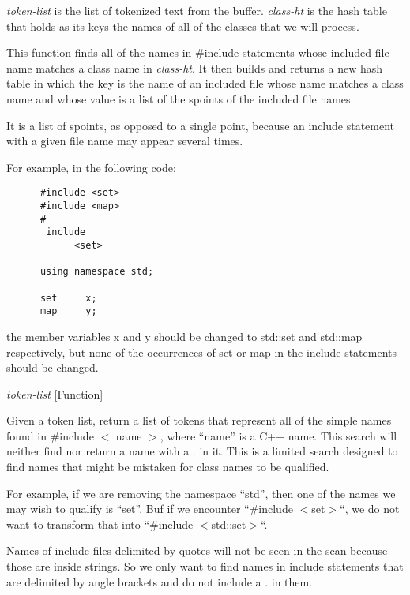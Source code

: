 \begin{doc-string}
\emph{token-list} is the list of tokenized text from the buffer.  \emph{class-ht} is the
hash table that holds as its keys the names of all of the classes that we will
process.

This function finds all of the names in \#include statements whose included file
name matches a class name in \emph{class-ht}.  It then builds and returns a new hash
table in which the key is the name of an included file whose name matches a
class name and whose value is a list of the spoints of the included file names.

It is a list of spoints, as opposed to a single point, because an include
statement with a given file name may appear several times.

For example, in the following code:

\small{\begin{verbatim}
      #include <set>
      #include <map>
      #
       include
            <set>

      using namespace std;

      set     x;
      map     y;
\end{verbatim}}

the member variables x and y should be changed to std::set and std::map
respectively, but none of the occurrences of set or map in the include
statements should be changed.
\end{doc-string}

\vspace{1em}
\noindent
{}
\usebox{\funcname}\emph{token-list}
 \hfill [Function]

\begin{doc-string}
Given a token list, return a list of tokens that represent all of the simple
names found in \#include $<$ name $>$, where ``name'' is a C++ name.  This search
will neither find nor return a name with a . in it.  This is a limited search
designed to find names that might be mistaken for class names to be qualified.

For example, if we are removing the namespace ``std'', then one of the names we
may wish to qualify is ``set''.  Buf if we encounter ``\#include $<$set$>$``, we do
not want to transform that into ``\#include $<$std::set$>$``.

Names of include files delimited by quotes will not be seen in the scan because
those are inside strings.  So we only want to find names in include statements
that are delimited by angle brackets and do not include a . in them.
\end{doc-string}

